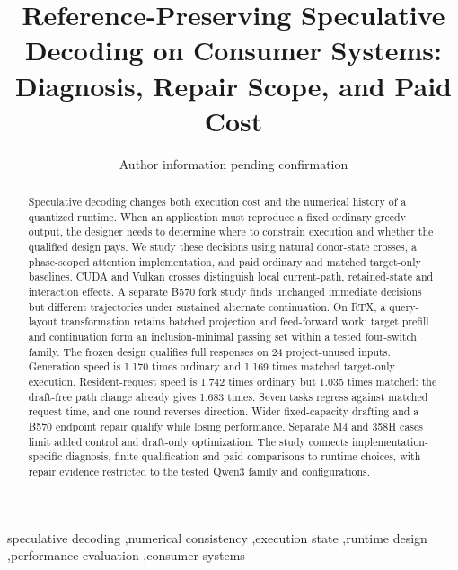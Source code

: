 \documentclass[final,5p,times,twocolumn]{elsarticle}
\begin{document}
\begin{frontmatter}
\title{Reference-Preserving Speculative Decoding on Consumer Systems: Diagnosis, Repair Scope, and Paid Cost}
\author{Author information pending confirmation}
\begin{abstract}
Speculative decoding changes both execution cost and the numerical history of a quantized runtime. When an application must reproduce a fixed ordinary greedy output, the designer needs to determine where to constrain execution and whether the qualified design pays. We study these decisions using natural donor-state crosses, a phase-scoped attention implementation, and paid ordinary and matched target-only baselines. CUDA and Vulkan crosses distinguish local current-path, retained-state and interaction effects. A separate B570 fork study finds unchanged immediate decisions but different trajectories under sustained alternate continuation. On RTX, a query-layout transformation retains batched projection and feed-forward work; target prefill and continuation form an inclusion-minimal passing set within a tested four-switch family. The frozen design qualifies full responses on 24 project-unused inputs. Generation speed is 1.170 times ordinary and 1.169 times matched target-only execution. Resident-request speed is 1.742 times ordinary but 1.035 times matched: the draft-free path change already gives 1.683 times. Seven tasks regress against matched request time, and one round reverses direction. Wider fixed-capacity drafting and a B570 endpoint repair qualify while losing performance. Separate M4 and 358H cases limit added control and draft-only optimization. The study connects implementation-specific diagnosis, finite qualification and paid comparisons to runtime choices, with repair evidence restricted to the tested Qwen3 family and configurations.
\end{abstract}
\begin{keyword}
speculative decoding \sep numerical consistency \sep execution state \sep runtime design \sep performance evaluation \sep consumer systems
\end{keyword}
\end{frontmatter}











\end{document}
